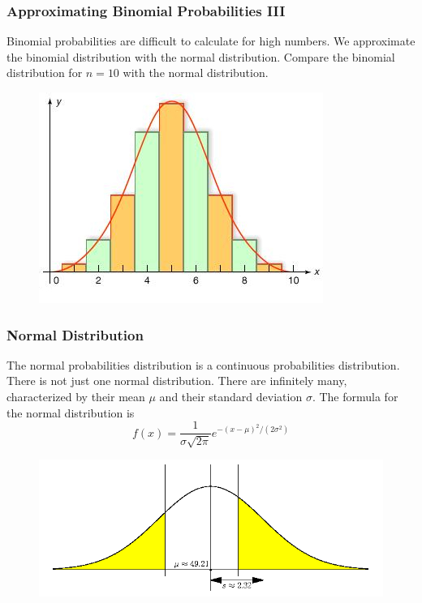 \documentclass[xcolor=dvipsnames]{beamer}
\begin{document}
\begin{frame}
  \frametitle{Approximating Binomial Probabilities III}
Binomial probabilities are difficult to calculate for high numbers. We
approximate the binomial distribution with the \alert{normal distribution}.
Compare the binomial distribution for $n=10$ with the normal
distribution.
  \begin{figure}[h]
    \includegraphics[scale=.5]{./diagrams/binnorm1_ed.jpg}
  \end{figure}
\end{frame}

\begin{frame}
  \frametitle{Normal Distribution}
  The normal probabilities distribution is a \alert{continuous}
  probabilities distribution. There is not just one normal
  distribution. There are infinitely many, characterized by their
  \alert{mean $\mu$} and their \alert{standard deviation $\sigma$}.
  The formula for the normal distribution is
  \begin{equation}
    \label{eq:aitoolah}
    f(x)=\frac{1}{\sigma\sqrt{2\pi}}e^{-(x-\mu)^{2}/(2\sigma^{2})}
  \end{equation}
  \begin{figure}[h]
    \includegraphics[scale=.4]{./diagrams/qfour.png}
  \end{figure}
\end{frame}
\end{document}
